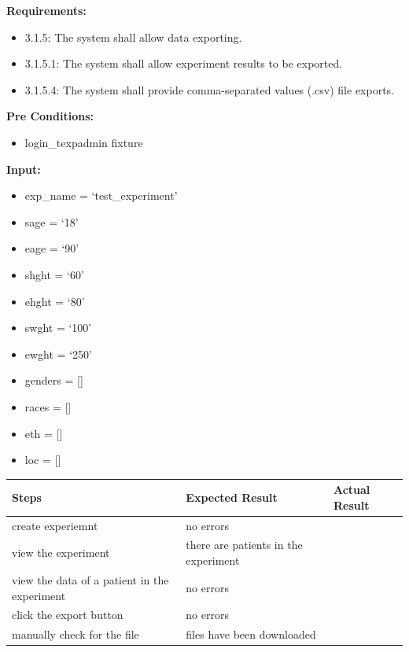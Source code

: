 \documentclass[letterpaper,10pt,english]{sphinxmanual}
\begin{document}
\begin{fulllineitems}
\label{STD/test_export:test_export.test_export_experiment_results}
\textbf{Requirements:}
\begin{itemize}
\item {} 
3.1.5: The system shall allow data exporting.

\item {} 
3.1.5.1: The system shall allow experiment results to be exported.

\item {} 
3.1.5.4: The system shall provide comma-separated values (.csv) file exports.

\end{itemize}

\textbf{Pre Conditions:}
\begin{itemize}
\item {} 
login\_texpadmin fixture

\end{itemize}

\textbf{Input:}
\begin{itemize}
\item {} 
exp\_name = `test\_experiment'

\item {} 
sage = `18'

\item {} 
eage = `90'

\item {} 
shght = `60'

\item {} 
ehght = `80'

\item {} 
swght = `100'

\item {} 
ewght = `250'

\item {} 
genders = {[}{]}

\item {} 
races = {[}{]}

\item {} 
eth = {[}{]}

\item {} 
loc = {[}{]}

\end{itemize}

\begin{tabulary}{\linewidth}{|L|L|L|}
\hline
\textsf{\relax 
Steps
} & \textsf{\relax 
Expected Result
} & \textsf{\relax 
Actual Result
}\\
\hline
create experiemnt
 & 
no errors
 & \\
\hline
view the experiment
 & 
there are patients in the experiment
 & \\
\hline
view the data of a patient in the experiment
 & 
no errors
 & \\
\hline
click the export button
 & 
no errors
 & \\
\hline
manually check for the file
 & 
files have been downloaded
 & \\
\hline\end{tabulary}



\end{fulllineitems}
\end{document}
